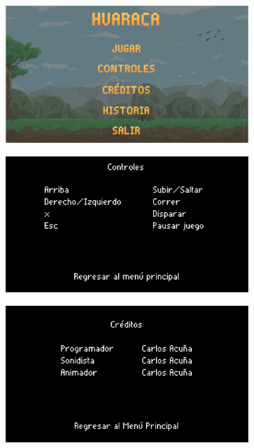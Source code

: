\documentclass[a4paper, openright, 12pt]{report}
\begin{document}
\begin{figure}[h!]
  \centering
  \begin{subfigure}[b]{0.3\linewidth}
    \includegraphics[width=\linewidth]{T13_01}
  \end{subfigure}
  \begin{subfigure}[b]{0.3\linewidth}
    \includegraphics[width=\linewidth]{T14_01}
  \end{subfigure}
  \begin{subfigure}[b]{0.3\linewidth}
    \includegraphics[width=\linewidth]{T15_01}

\end{subfigure}
\end{figure}
\end{document}
